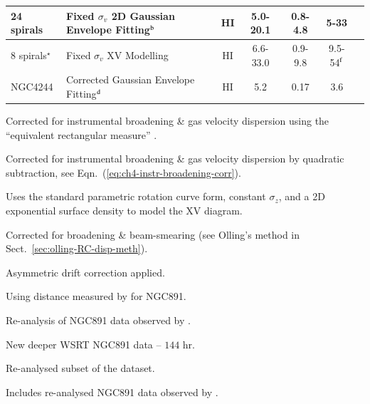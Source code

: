 \documentclass[traditabstract]{aa} %
\begin{document}
\begin{table}[t]
\begin{footnotesize}
\begin{tabular}{lp{4.0cm}ccccl}
      \hline
      24 spirals & Fixed $\sigma_v$ 2D Gaussian Envelope
      Fitting$^{\rm b}$ & H{\scriptsize I} & 5.0-20.1 & 0.8-4.8 & 5-33 &
      \protect\citet{grsk2002} \\
      \hline
      8 spirals$^{\star}$ & Fixed $\sigma_v$ XV Modelling & H{\scriptsize I} &
      6.6-33.0 & 0.9-9.8
      & 9.5-54$^{\rm f}$ & \protect\citet{kvdk2004} \\
      \hline
      NGC4244 & Corrected Gaussian Envelope Fitting$^{\rm d}$ & H{\scriptsize I} &
      5.2 & 0.17 & 3.6 & \protect\citet{olling1996a} \\
      \hline
    \end{tabular}
\begin{list}{}{}
\item[$^{\mathrm{a}}$] Corrected for instrumental broadening \& gas velocity
        dispersion using the ``equivalent rectangular measure''
        \citep{sbs1966}.
\item[$^{\mathrm{b}}$] Corrected for instrumental broadening \& gas velocity
      dispersion by quadratic subtraction, 
see Eqn.~(\ref{eq:ch4-instr-broadening-corr}).
\item[$^{\mathrm{c}}$] Uses the standard \citet{fe1980} parametric rotation
        curve form, constant $\sigma_z$, and a 2D exponential surface
        density to model the XV diagram.
\item[$^{\mathrm{d}}$] Corrected for broadening \& beam-smearing (see Olling's
        method in Sect.~\ref{sec:olling-RC-disp-meth}).
\item[$^{\mathrm{e}}$] Asymmetric drift correction applied.
\item[$^{\mathrm{f}}$] Using distance measured by \citet{vdkruit1981} for 
NGC891.
\item[$^{\mathrm{\dagger}}$] Re-analysis of NGC891 data observed by 
\citet{sa1979}.
\item[$^{\mathrm{\ddagger}}$] New deeper WSRT NGC891 data -- $144$ hr.
\item[$^{\mathrm{\#}}$] Re-analysed subset of the \citet{swaters1999} dataset.
\item[$^{\mathrm{\star}}$] Includes re-analysed NGC891 data observed by 
\citet{ssvdh1997}.
\end{list}
  \end{footnotesize}
\end{table}
\end{document}
